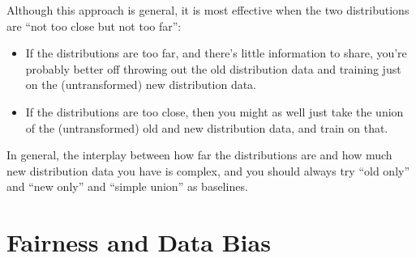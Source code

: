 Although this approach is general, it is most effective when the two distributions are ``not too close but not too far'':
\begin{itemize}
\item If the distributions are too far, and there's little information to share, you're probably better off throwing out the old distribution data and training just on the (untransformed) new distribution data.
\item If the distributions are too close, then you might as well just take the union of the (untransformed) old and new distribution data, and train on that.
\end{itemize}
In general, the interplay between how far the distributions are and how much new distribution data you have is complex, and you should always try ``old only'' and ``new only'' and ``simple union'' as baselines.

\section{Fairness and Data Bias}

